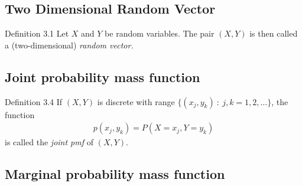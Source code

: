 \subsection{Two Dimensional Random Vector}
\begin{boks}{Definition 3.1}
Let $X$ and $Y$ be random variables. The pair $(X,Y)$ is then called a (two-dimensional) \textit{random vector.}
\end{boks}

%
\subsection{Joint probability mass function}
\begin{boks}{Definition 3.4}
  If $(X, Y)$ is discrete with range $\{(x_j, y_k) \ : \ j,k = 1,2, \ldots\}$, the function
  \begin{align*}
    p(x_j, y_k) = P(X = x_j, Y = y_k)
  \end{align*}
  is called the \textit{joint pmf} of $(X, Y)$.
\end{boks}

\subsection{Marginal probability mass function}

